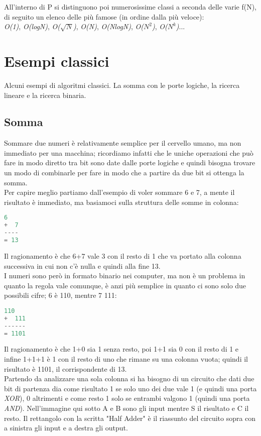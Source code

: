 All'interno di P si distinguono poi numerosissime classi a seconda delle  varie f(N), di seguito un elenco delle più famose (in ordine dalla più veloce):\\
\textit{O(1)}, \textit{O(logN)}, \textit{O($\sqrt{N}$)}, \textit{O(N)}, \textit{O(NlogN)}, \textit{O($N^2$)}, \textit{O($N^k$)}...
\section{Esempi classici}
Alcuni esempi di algoritmi classici. La somma con le porte logiche, la ricerca lineare e la ricerca binaria.
\subsection{Somma}
Sommare due numeri è relativamente semplice per il cervello umano, ma non immediato per una macchina; ricordiamo infatti che le uniche operazioni che può fare in modo diretto tra bit sono date dalle porte logiche e quindi bisogna trovare un modo di combinarle per fare in modo che a partire da due bit si ottenga la somma.\\
Per capire meglio partiamo dall'esempio di voler sommare 6 e 7, a mente il risultato è immediato, ma basiamoci sulla struttura delle somme in colonna:
\begin{lstlisting}[language=python]
   6
+  7
----
= 13
\end{lstlisting}
Il ragionamento è che 6+7 vale 3 con il resto di 1 che va portato alla colonna successiva in cui non c'è nulla e quindi alla fine 13.\\
I numeri sono però in formato binario nei computer, ma non è un problema in quanto la regola vale comunque, è anzi più semplice in quanto ci sono solo due possibili cifre; 6 è 110, mentre 7 111:
\begin{lstlisting}[language=python]
   110
+  111
------
= 1101
\end{lstlisting}
Il ragionamento è che 1+0 sia 1 senza resto, poi 1+1 sia 0 con il resto di 1 e infine 1+1+1 è 1 con il resto di uno che rimane su una colonna vuota; quindi il risultato è 1101, il corrispondente di 13.\\
Partendo da analizzare una sola colonna si ha bisogno di un circuito che dati due bit di partenza dia come risultato 1 se solo uno dei due vale 1 (e quindi una porta \textit{XOR}), 0 altrimenti e come resto 1 solo se entrambi valgono 1 (quindi una porta \textit{AND}). Nell'immagine qui sotto A e B sono gli input mentre S il risultato e C il resto. Il rettangolo con la scritta "Half Adder" è il riassunto del circuito sopra con a sinistra gli input e a destra gli output.
